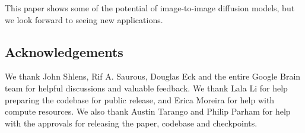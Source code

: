 This paper shows some of the potential of image-to-image diffusion models, but we look forward to seeing new applications.

\subsection*{Acknowledgements}
We thank John Shlens, Rif A. Saurous, Douglas Eck and the entire Google Brain team for helpful discussions and valuable feedback. We thank Lala Li for help preparing the codebase for public release, and  Erica Moreira for help with compute resources. We also thank Austin Tarango and Philip Parham for help with the approvals for releasing the paper, codebase and checkpoints. 


